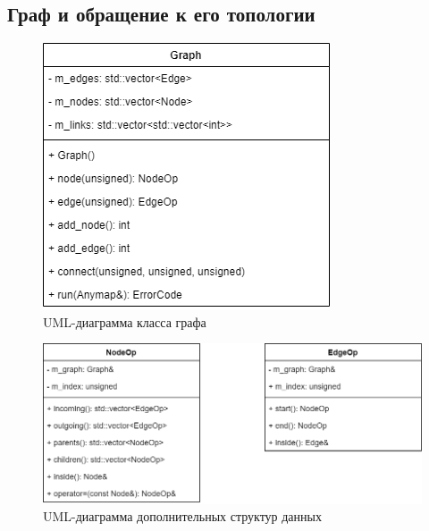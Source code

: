 \subsection{Граф и обращение к его топологии}
\begin{frame}%
	\begin{figure}
		\centering
		\includegraphics[scale=0.5]{images/class.graph.png}
		\caption{UML-диаграмма класса графа}
	\end{figure}
\end{frame}

\begin{frame}
	\begin{figure}
		\centering
		\includegraphics[width=\textwidth]{images/structure_additional.png}
		\caption{UML-диаграмма дополнительных структур данных}
	\end{figure}
\end{frame}
